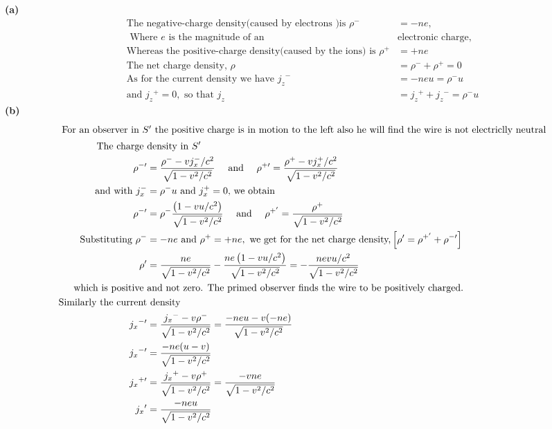 \begin{answer}
	\textbf{(a) }
	\begin{align*}
	\text{The negative-charge density(caused by electrons )is }\rho^-&=-ne, \\
	\text{ Where $e$ is the magnitude of an }&\text{electronic charge,}\\
	\text{Whereas the positive-charge density(caused by the ions) is }\rho^+&=+ne\\
	\text{The net charge density, }\rho&=\rho^-+\rho^+=0\\
	\text{As for the current density we have }{j_z}^-&=-neu=\rho^-u\\
	\text{and }{j_z}^+=0, \text{ so that }j_z&={j_z}^++{j_z}^-=\rho^-u
	\end{align*}
	\textbf{(b) }
	\begin{align*}
	\intertext{ For an observer in $S^\prime$ the positive charge is in motion to the left also he will find the wire is not electriclly neutral}
	\text{The charge   }&\text{density in $S^\prime$}\\
	\rho^{-\prime}&=\frac{\rho^{-}-v j_{x}^{-} / c^{2}}{\sqrt{1-v^{2} / c^{2}}} \quad \text { and } \quad \rho^{+\prime}=\frac{\rho^{+}-v j_{x}^{+} / c^{2}}{\sqrt{1-v^{2} / c^{2}}}\\
	\text { and with } j_{x}^{-}&=\rho^{-} u \text { and } j_{x}^{+}=0 \text {, we obtain }\\
	\rho^{-\prime}&=\rho^{-} \frac{\left(1-v u / c^{2}\right)}{\sqrt{1-v^{2} / c^{2}}} \quad \text { and } \quad \rho^{+^{\prime}}=\frac{\rho^{+}}{\sqrt{1-v^{2} / c^{2}}}\\
\text{	Substituting }\rho^{-}&=-n e\text{ and }\rho^{+}=+n e,\text{ we get for the net charge density,} \left[\rho^{\prime}=\rho^{+^{\prime}}+\rho^{-\prime}\right]\\
\rho^{\prime}&=\frac{n e}{\sqrt{1-v^{2} / c^{2}}}-\frac{n e\left(1-v u / c^{2}\right)}{\sqrt{1-v^{2} / c^{2}}}=-\frac{n e v u / c^{2}}{\sqrt{1-v^{2} / c^{2}}}\\
\text{which is positive }&\text{and not zero. The primed observer finds the wire to be positively charged.}\\
\text{Similarly the current}&\text{ density}\\
{j_x}^{-\prime}&=\frac{{j_x}^--v\rho^-}{\sqrt{1-v^{2} / c^{2}}}=\frac{-neu-v(-ne)}{\sqrt{1-v^{2} / c^{2}}}\\
{j_x}^{-\prime}&=\frac{-ne(u-v)}{\sqrt{1-v^{2} / c^{2}}}\\
{j_x}^{+\prime}&=\frac{{j_x}^+-v\rho^+}{\sqrt{1-v^{2} / c^{2}}}=\frac{-vne}{\sqrt{1-v^{2} / c^{2}}}\\
{j_x}^{\prime}&=\frac{-neu}{\sqrt{1-v^{2} / c^{2}}}
\end{align*}
\end{answer}
